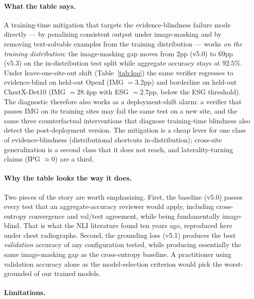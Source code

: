 \documentclass[pmlr]{jmlr}
\begin{document}
\paragraph{What the table says.} A training-time mitigation that targets the evidence-blindness failure mode directly — by penalizing consistent output under image-masking and by removing text-solvable examples from the training distribution — works \emph{on the training distribution}: the image-masking gap moves from $2$pp (v5.0) to $69$pp (v5.3) on the in-distribution test split while aggregate accuracy stays at $92.5\%$. Under leave-one-site-out shift (Table~\ref{tab:loo}) the same verifier regresses to evidence-blind on held-out OpenI (IMG $= 3.2$pp) and borderline on held-out ChestX-Det10 (IMG $= 28.4$pp with ESG $= 2.7$pp, below the ESG threshold). The diagnostic therefore also works as a deployment-shift alarm: a verifier that passes IMG on its training sites may fail the same test on a new site, and the same three counterfactual interventions that diagnose training-time blindness also detect the post-deployment version. The mitigation is a cheap lever for one class of evidence-blindness (distributional shortcuts in-distribution); cross-site generalization is a second class that it does not reach, and laterality-turning claims (IPG $\approx 0$) are a third.

\paragraph{Why the table looks the way it does.} Two pieces of the story are worth emphasizing. First, the baseline (v5.0) passes every test that an aggregate-accuracy reviewer would apply, including cross-entropy convergence and val/test agreement, while being fundamentally image-blind. That is what the NLI literature found ten years ago, reproduced here under chest radiographs. Second, the grounding loss (v5.1) produces the best \emph{validation} accuracy of any configuration tested, while producing essentially the same image-masking gap as the cross-entropy baseline. A practitioner using validation accuracy alone as the model-selection criterion would pick the worst-grounded of our trained models.

\paragraph{Limitations.}
\label{sec:limitations}
\end{document}
